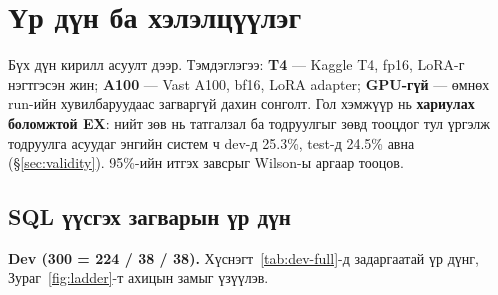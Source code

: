 
\chapter{Үр дүн ба хэлэлцүүлэг}
\label{ch:results}
\pagecolor{white}

Бүх дүн кирилл асуулт дээр. Тэмдэглэгээ: \textbf{T4} --- Kaggle T4, fp16, LoRA-г нэгтгэсэн жин; \textbf{A100} --- Vast
A100, bf16, LoRA adapter; \textbf{GPU-гүй} --- өмнөх run-ийн хувилбаруудаас загваргүй дахин сонголт. Гол хэмжүүр нь
\textbf{хариулах боломжтой EX}: нийт зөв нь татгалзал ба тодруулгыг зөвд тооцдог тул үргэлж тодруулга асуудаг энгийн
систем ч dev-д 25.3\%, test-д 24.5\% авна (§\ref{sec:validity}). 95\%-ийн итгэх завсрыг Wilson-ы аргаар тооцов.

\section{SQL үүсгэх загварын үр дүн}
\label{sec:numbers}

\textbf{Dev (300 = 224 / 38 / 38).} Хүснэгт~\ref{tab:dev-full}-д задаргаатай үр дүнг, Зураг~\ref{fig:ladder}-т ахицын
замыг үзүүлэв.

